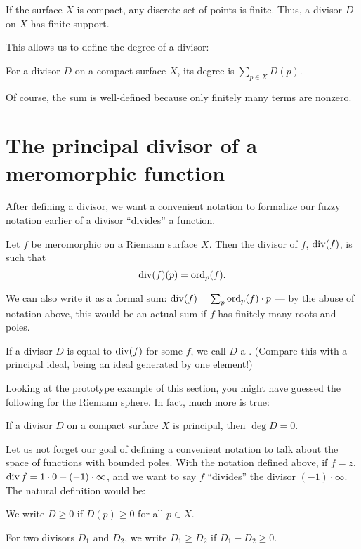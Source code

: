 If the surface $X$ is compact, any discrete set of points is finite. Thus, a divisor $D$ on $X$ has
finite support.

This allows us to define the degree of a divisor:
\begin{definition}
	For a divisor $D$ on a compact surface $X$, its degree is $\sum_{p \in X} D(p)$.
\end{definition}
Of course, the sum is well-defined because only finitely many terms are nonzero.

\section{The principal divisor of a meromorphic function}
After defining a divisor, we want a convenient notation to formalize our fuzzy notation earlier of a
divisor ``divides'' a function.

\begin{definition}
	Let $f$ be meromorphic on a Riemann surface $X$. Then the divisor of $f$, $\operatorname{div}(f)$, is such
	that
	\[
		\operatorname{div}(f)(p) = \operatorname{ord}_p(f).
	\]
\end{definition}

We can also write it as a formal sum: $\operatorname{div}(f) = \sum_p \operatorname{ord}_p(f) \cdot p$ --- by the abuse of
notation above, this would be an actual sum if $f$ has finitely many roots and poles.

If a divisor $D$ is equal to $\operatorname{div}(f)$ for some $f$, we call $D$ a .
(Compare this with a principal ideal, being an ideal generated by one element!)

Looking at the prototype example of this section, you might have guessed the following for the
Riemann sphere. In fact, much more is true:
\begin{proposition}
	If a divisor $D$ on a compact surface $X$ is principal, then $\deg D = 0$.
\end{proposition}

Let us not forget our goal of defining a convenient notation to talk about the space of functions
with bounded poles.
With the notation defined above, if $f = z$, $\operatorname{div} f = 1 \cdot 0 + (-1) \cdot \infty$,
and we want to say $f$ ``divides'' the divisor $(-1) \cdot \infty$. The natural definition would be:
\begin{definition}
	We write $D \geq 0$ if $D(p) \geq 0$ for all $p \in X$.

	For two divisors $D_1$ and $D_2$, we write $D_1 \geq D_2$ if $D_1-D_2 \geq 0$.
\end{definition}

